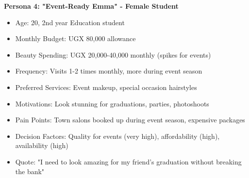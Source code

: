 \documentclass[a4paper,12pt]{article}
\begin{document}
\textbf{Persona 4: "Event-Ready Emma" - Female Student}
\begin{itemize}[leftmargin=2em]
    \item Age: 20, 2nd year Education student
    \item Monthly Budget: UGX 80,000 allowance
    \item Beauty Spending: UGX 20,000-40,000 monthly (spikes for events)
    \item Frequency: Visits 1-2 times monthly, more during event season
    \item Preferred Services: Event makeup, special occasion hairstyles
    \item Motivations: Look stunning for graduations, parties, photoshoots
    \item Pain Points: Town salons booked up during event season, expensive packages
    \item Decision Factors: Quality for events (very high), affordability (high), availability (high)
    \item Quote: "I need to look amazing for my friend's graduation without breaking the bank"
\end{itemize}

\vspace{1em}
\end{document}
